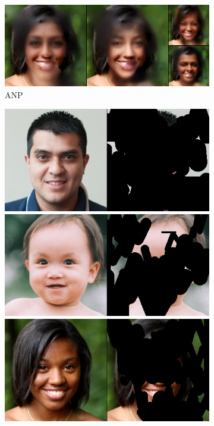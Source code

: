 \begin{figure}[t]
\begin{subfigure}[t]{0.25\textwidth}
      \includegraphics[height=\ffhqimgheight]{figs/cigcvae/image-samples/ffhq256/freeform_anp_32_samples.jpg}
      \caption{\scriptsize ANP}
    \end{subfigure}
    \begin{subfigure}[t]{0.22\textwidth}
      \centering
      \includegraphics[height=\ffhqimgheight]{figs/cigcvae/image-samples/ffhq256/freeform_aipo_0_gt_masked.jpg}
      \includegraphics[height=\ffhqimgheight]{figs/cigcvae/image-samples/ffhq256/freeform_aipo_13_gt_masked.jpg}
      \includegraphics[height=\ffhqimgheight]{figs/cigcvae/image-samples/ffhq256/freeform_aipo_32_gt_masked.jpg}

\end{subfigure}
\end{figure}
